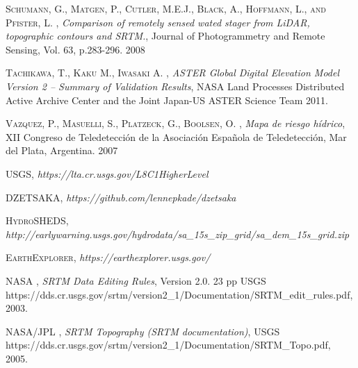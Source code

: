 \begin{thebibliography}{9}
 \textsc{Schumann, G., Matgen, P., Cutler, M.E.J., Black, A., Hoffmann, L., and Pfister, L.} , \textit{Comparison of remotely sensed wated stager from LiDAR, topographic contours and SRTM.}, Journal of Photogrammetry and Remote Sensing, Vol. 63, p.283-296. 2008

 \textsc{Tachikawa, T., Kaku M., Iwasaki A.} , \textit{ASTER Global Digital Elevation Model Version 2 – Summary of Validation Results},  NASA Land Processes Distributed Active Archive Center and the Joint Japan-US ASTER Science Team 2011.

 \textsc{Vazquez, P., Masuelli, S., Platzeck, G., Boolsen, O.} , \textit{Mapa de riesgo hídrico}, XII Congreso de Teledetección de la Asociación Española de Teledetección, Mar del Plata, Argentina. 2007

 \textsc{USGS}, \textit{https://lta.cr.usgs.gov/L8C1HigherLevel}

 \textsc{DZETSAKA}, \textit{https://github.com/lennepkade/dzetsaka}

 \textsc{HydroSHEDS}, \textit{http://earlywarning.usgs.gov/hydrodata/sa\_15s\_zip\_grid/sa\_dem\_15s\_grid.zip}

 \textsc{EarthExplorer}, \textit{https://earthexplorer.usgs.gov/}

 \textsc{NASA} , \textit{SRTM Data Editing Rules}, Version 2.0. 23 pp USGS \\https://dds.cr.usgs.gov/srtm/version2\_1/Documentation/SRTM\_edit\_rules.pdf, 2003.

 \textsc{NASA/JPL} , \textit{SRTM Topography (SRTM documentation)}, USGS \\https://dds.cr.usgs.gov/srtm/version2\_1/Documentation/SRTM\_Topo.pdf, 2005.

\end{thebibliography}
